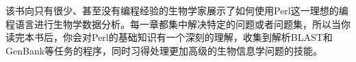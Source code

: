 \thispagestyle{empty}
该书向只有很少、甚至没有编程经验的生物学家展示了如何使用Perl这一理想的编程语言进行生物学数据分析。每一章都集中解决特定的问题或者问题集，所以当你读完本书后，你会对Perl的基础知识有一个深刻的理解，收集到解析BLAST和GenBank等任务的程序，同时习得处理更加高级的生物信息学问题的技能。
\newpage
\null
\thispagestyle{empty}
\newpage
